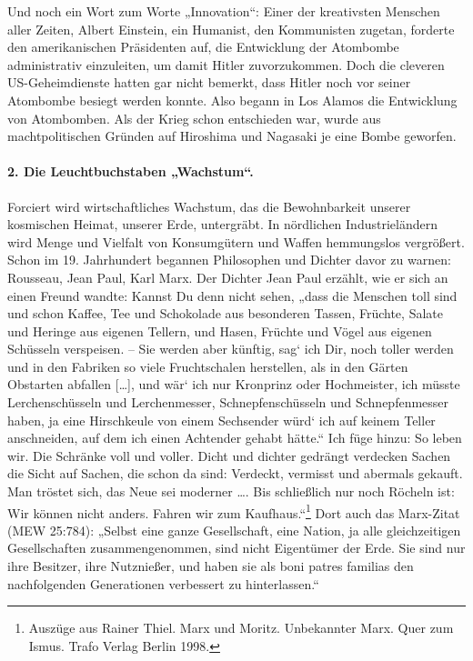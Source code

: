 \documentclass[12pt,a4paper]{article}
\begin{document}
Und noch ein Wort zum Worte „Innovation“: Einer der kreativsten Menschen aller
Zeiten, Albert Einstein, ein Humanist, den Kommunisten zugetan, forderte den
amerikanischen Präsidenten auf, die Entwicklung der Atombombe administrativ
einzuleiten, um damit Hitler zuvorzukommen. Doch die cleveren US-Geheimdienste
hatten gar nicht bemerkt, dass Hitler noch vor seiner Atombombe besiegt werden
konnte. Also begann in Los Alamos die Entwicklung von Atombomben. Als der
Krieg schon entschieden war, wurde aus machtpolitischen Gründen auf Hiroshima
und Nagasaki je eine Bombe geworfen.

\paragraph{2. Die Leuchtbuchstaben „Wachstum“.}
Forciert wird wirtschaftliches Wachstum, das die Bewohnbarkeit unserer
kosmischen Heimat, unserer Erde, untergräbt. In nördlichen Industrieländern
wird Menge und Vielfalt von Konsumgütern und Waffen hemmungslos vergrößert.
Schon im 19. Jahrhundert begannen Philosophen und Dichter davor zu warnen:
Rousseau, Jean Paul, Karl Marx. Der Dichter Jean Paul erzählt, wie er sich an
einen Freund wandte: Kannst Du denn nicht sehen, „dass die Menschen toll sind
und schon Kaffee, Tee und Schokolade aus besonderen Tassen, Früchte, Salate
und Heringe aus eigenen Tellern, und Hasen, Früchte und Vögel aus eigenen
Schüsseln verspeisen. – Sie werden aber künftig, sag‘ ich Dir, noch toller
werden und in den Fabriken so viele Fruchtschalen herstellen, als in den
Gärten Obstarten abfallen [\ldots], und wär‘ ich nur Kronprinz oder
Hochmeister, ich müsste Lerchenschüsseln und Lerchenmesser, Schnepfenschüsseln
und Schnepfenmesser haben, ja eine Hirschkeule von einem Sechsender würd‘ ich
auf keinem Teller anschneiden, auf dem ich einen Achtender gehabt hätte.“ Ich
füge hinzu: So leben wir. Die Schränke voll und voller. Dicht und dichter
gedrängt verdecken Sachen die Sicht auf Sachen, die schon da sind: Verdeckt,
vermisst und abermals gekauft. Man tröstet sich, das Neue sei moderner \ldots.
Bis schließlich nur noch Röcheln ist: Wir können nicht anders. Fahren wir zum
Kaufhaus.“\footnote{Auszüge aus Rainer Thiel. Marx und Moritz. Unbekannter
  Marx. Quer zum Ismus. Trafo Verlag Berlin 1998.} Dort auch das Marx-Zitat
(MEW 25:784): „Selbst eine ganze Gesellschaft, eine Nation, ja alle
gleichzeitigen Gesellschaften zusammengenommen, sind nicht Eigentümer der
Erde. Sie sind nur ihre Besitzer, ihre Nutznießer, und haben sie als boni
patres familias den nachfolgenden Generationen verbessert zu hinterlassen.“
\end{document}
